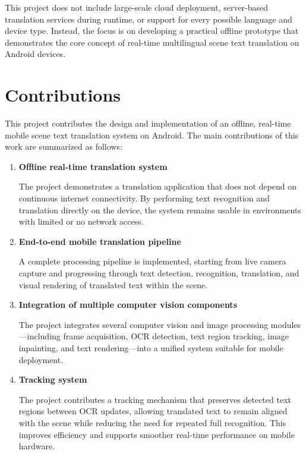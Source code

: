 This project does not include large-scale cloud deployment, server-based translation services during runtime, or support for every possible language and device type. Instead, the focus is on developing a practical offline prototype that demonstrates the core concept of real-time multilingual scene text translation on Android devices.

\section{Contributions}

This project contributes the design and implementation of an offline, real-time mobile scene text translation system on Android. The main contributions of this work are summarized as follows:

\begin{enumerate}

\item \textbf{Offline real-time translation system}

The project demonstrates a translation application that does not depend on continuous internet connectivity. By performing text recognition and translation directly on the device, the system remains usable in environments with limited or no network access.

\item \textbf{End-to-end mobile translation pipeline}

A complete processing pipeline is implemented, starting from live camera capture and progressing through text detection, recognition, translation, and visual rendering of translated text within the scene.

\item \textbf{Integration of multiple computer vision components}

The project integrates several computer vision and image processing modules—including frame acquisition, OCR detection, text region tracking, image inpainting, and text rendering—into a unified system suitable for mobile deployment.

\item \textbf{Tracking system}

The project contributes a tracking mechanism that preserves detected text regions between OCR updates, allowing translated text to remain aligned with the scene while reducing the need for repeated full recognition. This improves efficiency and supports smoother real-time performance on mobile hardware.   


\end{enumerate}
